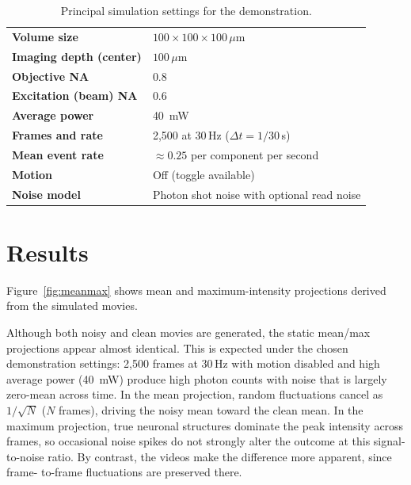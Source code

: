 \documentclass[conference]{IEEEtran}
\begin{document}
\begin{table}[t]
\centering
\caption{Principal simulation settings for the demonstration.}
\label{tab:params}
\begin{tabular}{@{}ll@{}}
\toprule
\textbf{Volume size} & $100\times100\times100\,\mu\text{m}$ \\
\textbf{Imaging depth (center)} & $100\,\mu\text{m}$ \\
\textbf{Objective NA} & 0.8 \\
\textbf{Excitation (beam) NA} & 0.6 \\
\textbf{Average power} & \SI{40}{\milli\watt} \\
\textbf{Frames and rate} & 2{,}500 at 30\,Hz ($\Delta t = 1/30$\,s) \\
\textbf{Mean event rate} & $\approx 0.25$ per component per second \\
\textbf{Motion} & Off (toggle available) \\
\textbf{Noise model} & Photon shot noise with optional read noise \\
\bottomrule
\end{tabular}
\end{table}

\section{Results}\label{sec:results}
Figure~\ref{fig:meanmax} shows mean and maximum-intensity projections derived
from the simulated movies.

Although both noisy and clean movies are generated, the static mean/max
projections appear almost identical. This is expected under the chosen
demonstration settings: 2{,}500 frames at 30\,Hz with motion disabled and
high average power (\SI{40}{\milli\watt}) produce high photon counts with
noise that is largely zero-mean across time. In the mean projection, random
fluctuations cancel as $1/\sqrt{N}$ ($N$ frames), driving the noisy mean
toward the clean mean. In the maximum projection, true neuronal structures
dominate the peak intensity across frames, so occasional noise spikes do
not strongly alter the outcome at this signal-to-noise ratio. By contrast,
the videos make the difference more apparent, since frame-
to-frame fluctuations are preserved there.
\end{document}

